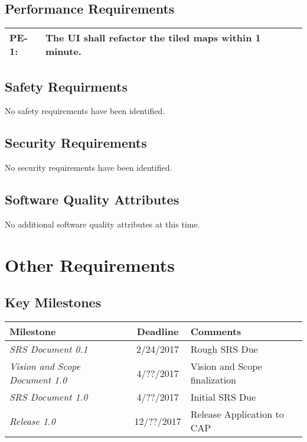 \documentclass[12pt, letterpaper]{article}
\begin{document}
\subsection{Performance Requirements}
\begin{tabularx}{\textwidth}{|l|X|} \hline
    PE-1: & The UI shall refactor the tiled maps within 1 minute. \\ \hline
\end{tabularx}

\subsection{Safety Requirments}
No safety requirements have been identified.

\subsection{Security Requirements}
No security requirements have been identified.

\subsection{Software Quality Attributes}
No additional software quality attributes at this time.

\pagebreak
\section{Other Requirements}
\subsection{Key Milestones}
\begin{tabularx}{\textwidth}{l c l} \hline
\textbf{Milestone} & \textbf{Deadline} & \textbf{Comments} \\ \hline
\textit{SRS Document 0.1} & 2/24/2017 & Rough SRS Due \\
\textit{Vision and Scope Document 1.0} & 4/??/2017 & Vision and Scope finalization \\
\textit{SRS Document 1.0} & 4/??/2017 & Initial SRS Due \\
\textit{Release 1.0} & 12/??/2017 & Release Application to CAP \\ \hline
\end{tabularx}

\appendix
\end{document}
